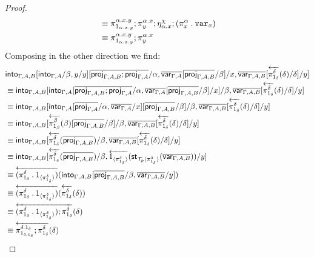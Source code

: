 \documentclass[10pt]{article}
\theoremstyle{definition}
\newcommand{\rewrite}[2]{\overleftarrow{#1}(#2)}
\newcommand\StI[2]{\ensuremath{\mathsf{st}_{#1}(#2)}}
\newcommand\ApEl[2]{\mathcal{T}_{#1}\langle#2\rangle}
\newcommand\bdot[0]{\mathbin{.}}
\begin{document}
\begin{proof}
\begin{align*}
&\equiv \pi^{\alpha.x.y}_{1_{\alpha.x.y}};\pi^{\alpha.x}_y;\eta^\chi_{\alpha.x};(\pi^\alpha_x \bdot \var{x}) \\
&\equiv \pi^{\alpha.x.y}_{1_{\alpha.x.y}};\pi^{\alpha.x}_y
\end{align*}
Composing in the other direction we find:
\begin{align*}
&\into{\Gamma, A, B}[\into{\Gamma, A}/\beta, y/y][\upstairs{\proj{\Gamma, A, B};\proj{\Gamma, A}}/\alpha, \upstairs{\qvar{\Gamma, A}}[\upstairs{\proj{\Gamma, A, B}}/\beta]/x, \upstairs{\qvar{\Gamma, A, B}}[\rewrite{\pi^\delta_{1_\delta}}{\delta}/\delta]/y] \\
&\equiv \into{\Gamma, A, B}[\into{\Gamma, A}[\upstairs{\proj{\Gamma, A, B};\proj{\Gamma, A}}/\alpha, \upstairs{\qvar{\Gamma, A}}[\upstairs{\proj{\Gamma, A, B}}/\beta]/x] /\beta, \upstairs{\qvar{\Gamma, A, B}}[\rewrite{\pi^\delta_{1_\delta}}{\delta}/\delta]/y] \\
&\equiv \into{\Gamma, A, B}[\into{\Gamma, A}[\upstairs{\proj{\Gamma, A}}/\alpha, \upstairs{\qvar{\Gamma, A}}/x][\upstairs{\proj{\Gamma, A, B}}/\beta]/\beta, \upstairs{\qvar{\Gamma, A, B}}[\rewrite{\pi^\delta_{1_\delta}}{\delta}/\delta]/y] \\
&\equiv \into{\Gamma, A, B}[\rewrite{\pi^{\beta}_{1_{\beta}}}{\beta}[\upstairs{\proj{\Gamma, A, B}}/\beta]/\beta, \upstairs{\qvar{\Gamma, A, B}}[\rewrite{\pi^\delta_{1_\delta}}{\delta}/\delta]/y] \\
&\equiv \into{\Gamma, A, B}[\rewrite{\pi^{\delta}_{1_{\delta}}}{\upstairs{\proj{\Gamma, A, B}}}/\beta, \upstairs{\qvar{\Gamma, A, B}}[\rewrite{\pi^\delta_{1_\delta}}{\delta}/\delta]/y]\\
&\equiv \into{\Gamma, A, B}[\rewrite{\pi^{\delta}_{1_{\delta}}}{\upstairs{\proj{\Gamma, A, B}}}/\beta, \rewrite{\ApOne{\pi^{\delta}_{1_{\delta}}}}{\StI{\ApEl{p}{\pi^{\delta}_{1_{\delta}}}}{\upstairs{\qvar{\Gamma, A, B}}}}/y]\\
&\equiv \rewrite{(\pi^{\delta}_{1_{\delta}} \bdot \ApOne{\pi^{\delta}_{1_{\delta}}})}{\into{\Gamma, A, B}[\upstairs{\proj{\Gamma, A, B}}/\beta, \upstairs{\qvar{\Gamma, A, B}}/y]}  \\
&\equiv \rewrite{(\pi^{\delta}_{1_{\delta}} \bdot \ApOne{\pi^{\delta}_{1_{\delta}}})}{\rewrite{\pi^{\delta}_{1_{\delta}}}{\delta}}  \\
&\equiv \rewrite{(\pi^{\delta}_{1_{\delta}} \bdot \ApOne{\pi^{\delta}_{1_{\delta}}});\pi^{\delta}_{1_{\delta}}}{\delta}  \\
&\equiv \rewrite{\pi^{\delta.1_\delta}_{1_{\delta.1_\delta}};\pi^{\delta}_{1_{\delta}}}{\delta}
\end{align*}
\end{proof}
\end{document}
